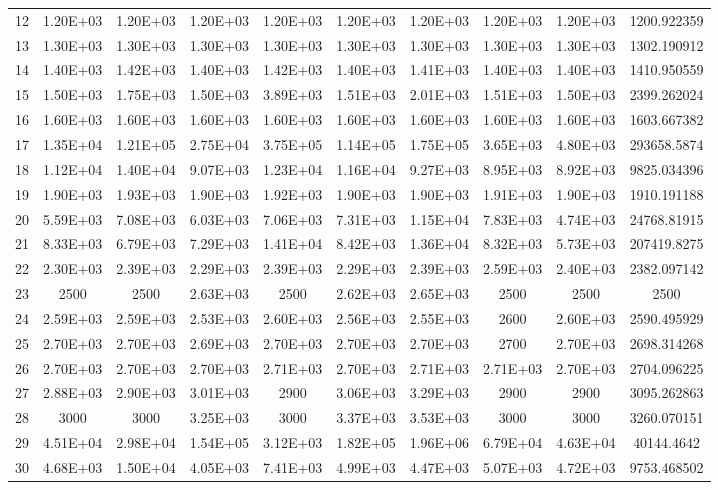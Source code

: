 \documentclass[
]{article}
\begin{document}
\begin{justify}
{\begin{table}[h!]
\begin{tabular}{||c c c c c c c c c c||}
12 & 1.20E+03 & 1.20E+03 & 1.20E+03& 1.20E+03& 1.20E+03& 1.20E+03& 1.20E+03& 1.20E+03& 1200.922359\\ 
13 & 1.30E+03 & 1.30E+03 & 1.30E+03& 1.30E+03& 1.30E+03& 1.30E+03& 1.30E+03& 1.30E+03 &1302.190912\\ 
14 & 1.40E+03 & 1.42E+03 & 1.40E+03& 1.42E+03& 1.40E+03& 1.41E+03& 1.40E+03& 1.40E+03 &1410.950559\\ 
15 & 1.50E+03 & 1.75E+03 & 1.50E+03& 3.89E+03& 1.51E+03& 2.01E+03& 1.51E+03& 1.50E+03&2399.262024\\ 
16 & 1.60E+03 & 1.60E+03 & 1.60E+03& 1.60E+03& 1.60E+03& 1.60E+03& 1.60E+03& 1.60E+03& 1603.667382\\ 
17 & 1.35E+04 & 1.21E+05 & 2.75E+04& 3.75E+05& 1.14E+05& 1.75E+05& 3.65E+03& 4.80E+03&293658.5874\\ 
18 & 1.12E+04 & 1.40E+04 & 9.07E+03& 1.23E+04& 1.16E+04& 9.27E+03& 8.95E+03& 8.92E+03&9825.034396\\ 
19 & 1.90E+03 & 1.93E+03 & 1.90E+03& 1.92E+03& 1.90E+03& 1.90E+03& 1.91E+03& 1.90E+03&1910.191188\\ 
20 & 5.59E+03 & 7.08E+03 & 6.03E+03& 7.06E+03& 7.31E+03& 1.15E+04& 7.83E+03& 4.74E+03 &24768.81915\\ 
21 & 8.33E+03 & 6.79E+03 & 7.29E+03& 1.41E+04& 8.42E+03& 1.36E+04& 8.32E+03& 5.73E+03&207419.8275\\ 
22 & 2.30E+03 & 2.39E+03 & 2.29E+03& 2.39E+03& 2.29E+03& 2.39E+03& 2.59E+03& 2.40E+03&2382.097142\\ 
23 & 2500 & 2500 & 2.63E+03& 2500& 2.62E+03& 2.65E+03& 2500& 2500&2500\\ 
24 & 2.59E+03 & 2.59E+03 & 2.53E+03& 2.60E+03& 2.56E+03& 2.55E+03& 2600& 2.60E+03&2590.495929\\ 
25 & 2.70E+03 & 2.70E+03 & 2.69E+03& 2.70E+03& 2.70E+03& 2.70E+03& 2700& 2.70E+03&2698.314268\\ 
26 & 2.70E+03 & 2.70E+03 & 2.70E+03& 2.71E+03& 2.70E+03& 2.71E+03& 2.71E+03& 2.70E+03 &2704.096225\\ 
27 & 2.88E+03 & 2.90E+03 & 3.01E+03& 2900& 3.06E+03& 3.29E+03& 2900& 2900&3095.262863\\ 
28 & 3000 & 3000 & 3.25E+03& 3000& 3.37E+03& 3.53E+03& 3000& 3000&3260.070151\\ 
29 & 4.51E+04 & 2.98E+04 & 1.54E+05& 3.12E+03& 1.82E+05& 1.96E+06& 6.79E+04& 4.63E+04&40144.4642\\ 
30 & 4.68E+03 & 1.50E+04 & 4.05E+03& 7.41E+03& 4.99E+03& 4.47E+03& 5.07E+03& 4.72E+03&9753.468502\\ 



\end{tabular}
\end{table}}
\end{justify}
\end{document}
